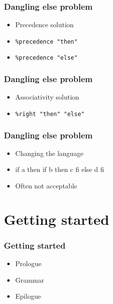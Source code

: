 \documentclass{beamer}
\begin{document}
\begin{frame}
  \frametitle{Dangling else problem}
    \begin{itemize}[<+->]
      \item Precedence solution
      \item \texttt{\%precedence "then"}
      \item \texttt{\%precedence "else"}
    \end{itemize}
\end{frame}

\begin{frame}
  \frametitle{Dangling else problem}
    \begin{itemize}[<+->]
      \item Associativity solution
      \item \texttt{\%right "then" "else"}
    \end{itemize}
\end{frame}

\begin{frame}
  \frametitle{Dangling else problem}
    \begin{itemize}[<+->]
      \item Changing the language
      \item if a then if b then c fi else d fi
      \item Often not acceptable
    \end{itemize}
\end{frame}

\section{Getting started}

\begin{frame}
  \frametitle{Getting started}
    \begin{itemize}[<+->]
      \item Prologue
      \item Grammar
      \item Epilogue
    \end{itemize}
\end{frame}
\end{document}
